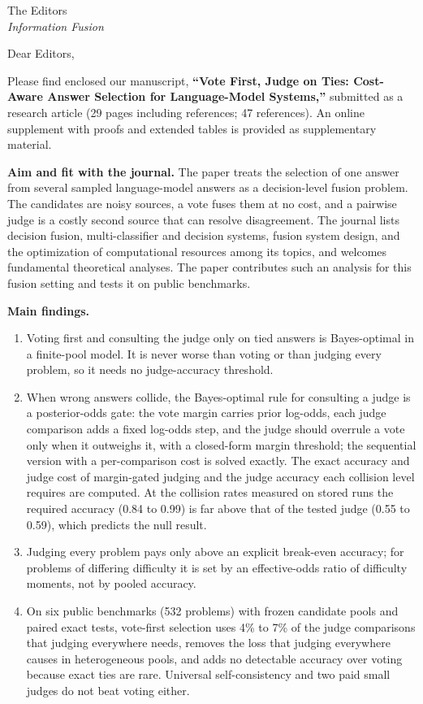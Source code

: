 \documentclass[11pt]{letter}
\begin{document}
\begin{letter}{The Editors \\ \emph{Information Fusion}}

\opening{Dear Editors,}

Please find enclosed our manuscript, \textbf{``Vote First, Judge on Ties: Cost-Aware Answer Selection for Language-Model Systems,''} submitted as a research article (29 pages including references; 47 references). An online supplement with proofs and extended tables is provided as supplementary material.

\textbf{Aim and fit with the journal.} The paper treats the selection of one answer from several sampled language-model answers as a decision-level fusion problem. The candidates are noisy sources, a vote fuses them at no cost, and a pairwise judge is a costly second source that can resolve disagreement. The journal lists decision fusion, multi-classifier and decision systems, fusion system design, and the optimization of computational resources among its topics, and welcomes fundamental theoretical analyses. The paper contributes such an analysis for this fusion setting and tests it on public benchmarks.

\textbf{Main findings.}
\begin{enumerate}[leftmargin=*,itemsep=2pt]
\item Voting first and consulting the judge only on tied answers is Bayes-optimal in a finite-pool model. It is never worse than voting or than judging every problem, so it needs no judge-accuracy threshold.
\item When wrong answers collide, the Bayes-optimal rule for consulting a judge is a posterior-odds gate: the vote margin carries prior log-odds, each judge comparison adds a fixed log-odds step, and the judge should overrule a vote only when it outweighs it, with a closed-form margin threshold; the sequential version with a per-comparison cost is solved exactly. The exact accuracy and judge cost of margin-gated judging and the judge accuracy each collision level requires are computed. At the collision rates measured on stored runs the required accuracy (0.84 to 0.99) is far above that of the tested judge (0.55 to 0.59), which predicts the null result.
\item Judging every problem pays only above an explicit break-even accuracy; for problems of differing difficulty it is set by an effective-odds ratio of difficulty moments, not by pooled accuracy.
\item On six public benchmarks (532 problems) with frozen candidate pools and paired exact tests, vote-first selection uses 4\% to 7\% of the judge comparisons that judging everywhere needs, removes the loss that judging everywhere causes in heterogeneous pools, and adds no detectable accuracy over voting because exact ties are rare. Universal self-consistency and two paid small judges do not beat voting either.
\end{enumerate}


\end{letter}
\end{document}

